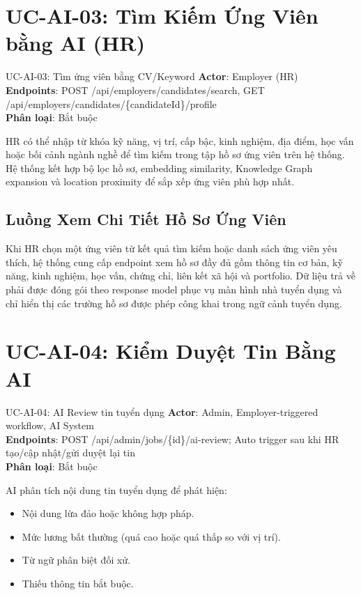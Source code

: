 \documentclass[12pt, a4paper]{report}
\begin{document}
\section{UC-AI-03: Tìm Kiếm Ứng Viên bằng AI (HR)}

\begin{requirementbox}{UC-AI-03: Tìm ứng viên bằng CV/Keyword}
\textbf{Actor}: Employer (HR) \\
\textbf{Endpoints}: POST /api/employers/candidates/search, GET /api/employers/candidates/\{candidateId\}/profile \\
\textbf{Phân loại}: Bắt buộc
\end{requirementbox}

HR có thể nhập từ khóa kỹ năng, vị trí, cấp bậc, kinh nghiệm, địa điểm, học vấn hoặc bối cảnh ngành nghề để tìm kiếm trong tập hồ sơ ứng viên trên hệ thống. Hệ thống kết hợp bộ lọc hồ sơ, embedding similarity, Knowledge Graph expansion và location proximity để sắp xếp ứng viên phù hợp nhất.

\subsection{Luồng Xem Chi Tiết Hồ Sơ Ứng Viên}

Khi HR chọn một ứng viên từ kết quả tìm kiếm hoặc danh sách ứng viên yêu thích, hệ thống cung cấp endpoint xem hồ sơ đầy đủ gồm thông tin cơ bản, kỹ năng, kinh nghiệm, học vấn, chứng chỉ, liên kết xã hội và portfolio. Dữ liệu trả về phải được đóng gói theo response model phục vụ màn hình nhà tuyển dụng và chỉ hiển thị các trường hồ sơ được phép công khai trong ngữ cảnh tuyển dụng.

\section{UC-AI-04: Kiểm Duyệt Tin Bằng AI}

\begin{requirementbox}{UC-AI-04: AI Review tin tuyển dụng}
\textbf{Actor}: Admin, Employer-triggered workflow, AI System \\
\textbf{Endpoints}: POST /api/admin/jobs/\{id\}/ai-review; Auto trigger sau khi HR tạo/cập nhật/gửi duyệt lại tin \\
\textbf{Phân loại}: Bắt buộc
\end{requirementbox}

AI phân tích nội dung tin tuyển dụng để phát hiện:
\begin{itemize}
    \item Nội dung lừa đảo hoặc không hợp pháp.
    \item Mức lương bất thường (quá cao hoặc quá thấp so với vị trí).
    \item Từ ngữ phân biệt đối xử.
    \item Thiếu thông tin bắt buộc.
\end{itemize}
\end{document}
